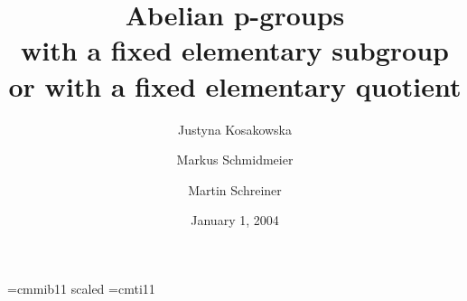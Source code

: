 \documentclass[twoside,leqno,12pt]{amsart}
\theoremstyle{definition}
\theoremstyle{remark}
\numberwithin{equation}{section}
\begin{document}
%
%
%
%
%
%
%
%
%

\font\bfit=cmmib11 scaled 
\font\itmed=cmti11
\def\boldp{{\bfit p}}
\def\medp{{\itmed p}}
\title[Abelian \medp-groups with a fixed elementary subgroup...]
      {Abelian \boldp-groups\\
        with a fixed elementary subgroup\\
        or with a fixed elementary quotient}



\author[J.\ Kosakowska]{Justyna Kosakowska}

\address{%
  Mathematics and Computer Science, Nicolaus Copernicus University, Toru\'n, Poland
}


\author[M.\ Schmidmeier]{Markus Schmidmeier}
\address{Mathematics and Statistics, Florida Atlantic University,
              Boca Raton, Florida}

\author[M.\ Schreiner]{Martin Schreiner}
\address{Woerthstr. 21, 81667 München, Germany}



\date{January 1, 2004}
\end{document}
